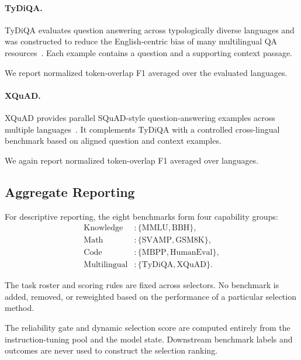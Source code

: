 \paragraph{TyDiQA.}
TyDiQA evaluates question answering across typologically diverse
languages and was constructed to reduce the English-centric bias of
many multilingual QA resources~\cite{clark2020tydiqa}. Each example
contains a question and a supporting context passage.

We report normalized token-overlap F1 averaged over the evaluated
languages.


\paragraph{XQuAD.}
XQuAD provides parallel SQuAD-style question-answering examples across
multiple languages~\cite{artetxe2020xquad}. It complements TyDiQA with
a controlled cross-lingual benchmark based on aligned question and
context examples.

We again report normalized token-overlap F1 averaged over languages.


\subsection{Aggregate Reporting}
\label{app:benchmark-aggregation}

For descriptive reporting, the eight benchmarks form four capability
groups:
\[
\begin{aligned}
\text{Knowledge} &: \{\text{MMLU},\text{BBH}\},\\
\text{Math} &: \{\text{SVAMP},\text{GSM8K}\},\\
\text{Code} &: \{\text{MBPP},\text{HumanEval}\},\\
\text{Multilingual} &: \{\text{TyDiQA},\text{XQuAD}\}.
\end{aligned}
\]

The task roster and scoring rules are fixed across selectors. No
benchmark is added, removed, or reweighted based on the performance of
a particular selection method.

The reliability gate and dynamic selection score are computed entirely
from the instruction-tuning pool and the model state. Downstream
benchmark labels and outcomes are never used to construct the
selection ranking.


